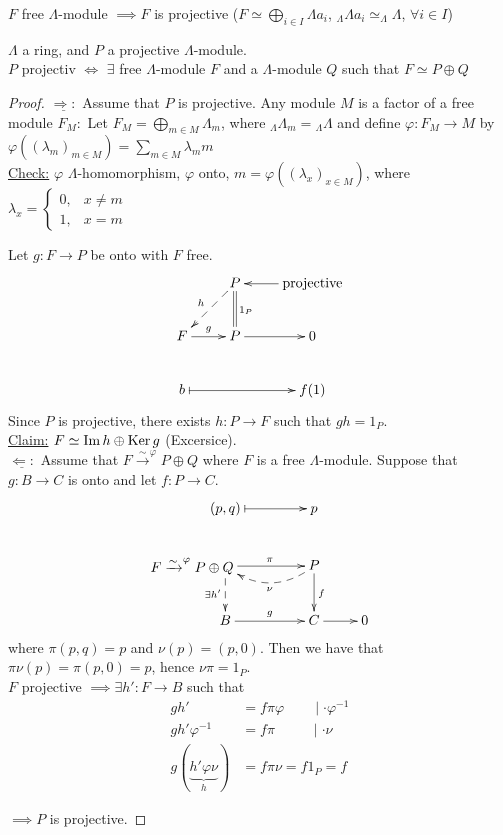 \begin{exer}
$F$ free $\Lambda$-module $\implies F$ is projective ($F \simeq \bigoplus_{i \in I} \Lambda a_i$, $_\Lambda \Lambda a_i \simeq _\Lambda \Lambda$, $\forall i \in I$)
\end{exer}
\begin{prop}
  $\Lambda$ a ring, and $P$ a projective $\Lambda$-module.\\
  $P$ projectiv $\iff$ $\exists$ free $\Lambda$-module $F$ and a
  $\Lambda$-module $Q$ such that $F \simeq P \oplus Q$
\begin{proof}
  $\underline{\Rightarrow :}$ Assume that $P$ is projective. Any
  module $M$ is a factor of a free module $F_M : $ Let $F_M =
  \bigoplus_{m \in M} \Lambda_m$, where ${_\Lambda\Lambda_m} =
  {_\Lambda\Lambda}$ and define $\varphi\colon  F_M \to M$ by
  $\varphi((\lambda_m)_{m \in M}) = \sum_{m \in M} \lambda_m m$\\ 
\underline{Check:} $\varphi$ $\Lambda$-homomorphism, $\varphi$ onto,
$m = \varphi((\lambda_x)_{x \in M})$, where $\lambda_x = \begin{cases} 
0, & x \neq m\\
1, & x = m
\end{cases}$ 

Let $g\colon  F \to P$ be onto with $F$ free.
$$\xymatrix{
& P\ar@{-->}[ld]_h \ar@{=}[d]^{1_P} & \text{projective} \ar[l]\\
F \ar[r]^g & P \ar[r] & 0\\
b\ar@{|->}[rr] && f(1)
}$$
Since $P$ is projective, there exists $h\colon  P \to F$ such that $gh = 1_P$.\\

\underline{Claim:} $F \simeq \operatorname{Im}\nolimits h \oplus \operatorname{Ker}\nolimits g$ (Excersice).\\

$\underline{\Leftarrow :}$ Assume that $F \xrightarrow{\sim}^\varphi P
\oplus Q$ where $F$ is a free $\Lambda$-module. Suppose that $g\colon  B \to
C$ is onto and let $f\colon  P \to C$.
$$
\xymatrix{
(p, q)\ar@{|->}[r] & p\\
*+[l]{F \xrightarrow{\sim}^\varphi P \oplus Q} \ar[r]^\pi \ar@{-->}[d]_{\exists h'} & P \ar@/^1pc/@{-->}[l]^\nu \ar[d]^f\\
B \ar[r]^g & C \ar[r] & 0
}
$$
where $\pi(p,q) = p$ and $\nu(p) = (p,0)$.  Then we have that
$\pi\nu(p) = \pi(p,0) = p$, hence $\nu\pi = 1_P$.\\
$F$ projective $\implies \exists h'\colon  F \to B$ such that 
\begin{equation*}
\begin{split}
gh' &= f\pi \varphi \;\;\;\;\;\;\; \mid \cdot \varphi^{-1}\\
gh'\varphi^{-1} &= f\pi \;\;\;\;\;\;\;\;\; \mid \cdot \nu\\
g(\underbrace{h'\varphi \nu}_h) &= f\pi\nu = f 1_P = f
\end{split}
\end{equation*}

$\implies P$ is projective.
\end{proof}
\end{prop}

